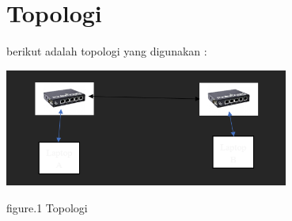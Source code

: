 \section{Topologi}

berikut adalah topologi yang digunakan :

\begin{center}
    \includegraphics[width=0.7\textwidth]{image/P5/Topologi.png}    
    
    figure.1 Topologi
\end{center}


